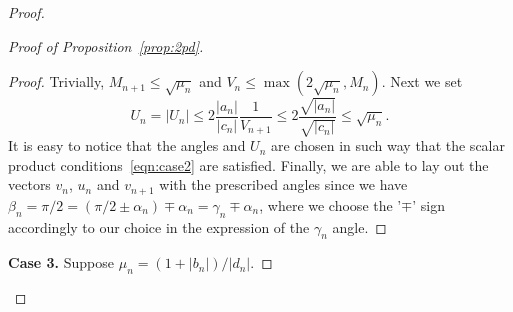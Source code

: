 \begin{proof}
\begin{proof}[Proof of Proposition~\ref{prop:2pd}]
\begin{proof}
            Trivially, $M_{n+1} \leq \sqrt{\mu_n}$ and $V_n \leq \max(2\sqrt{\mu_n}, M_n)$.
            Next we set
            \[
              U_n = |U_n| \leq 2 \frac{|a_n|}{|c_n|} \frac{1}{V_{n+1}} \leq 2 \frac{\sqrt{|a_n|}}{\sqrt{|c_n|}} \leq \sqrt{\mu_n}.
            \]
            It is easy to notice that the angles and $U_n$ are chosen in such way that the scalar product conditions~\eqref{eqn:case2} are satisfied.
            Finally, we are able to lay out the vectors $v_n$, $u_n$ and $v_{n+1}$ with the prescribed angles
              since we have $\beta_n = \pi/2 = (\pi/2 \pm \alpha_n) \mp \alpha_n = \gamma_n \mp \alpha_n$,
              where we choose the '$\mp$' sign accordingly to our choice in the expression of the $\gamma_n$ angle.
          \end{proof}
        \noindent\textbf{Case 3.} Suppose $\mu_n = (1 + |b_n|)/|d_n|$.


\end{proof}
\end{proof}
